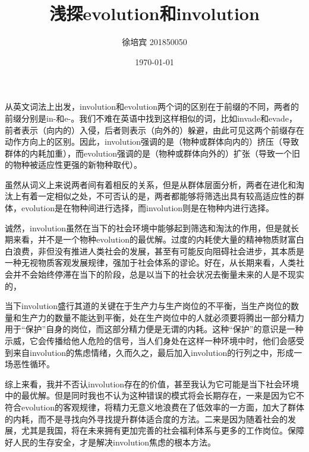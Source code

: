 \documentclass[UTF8]{article}
\title{浅探evolution和involution}
\author{徐培宾 201850050}
\date{\today}
\begin{document}
    \maketitle
    从英文词法上出发，involution和evolution两个词的区别在于前缀的不同，两者的前缀分别是in-和e-。我们不难在英语中找到这样相似的词，比如invade和evade，前者表示（向内的）入侵，后者则表示（向外的）躲避，由此可见这两个前缀存在动作方向上的区别。因此，involution强调的是（物种或群体向内的）挤压（导致群体的内耗加重），而evolution强调的是（物种或群体向外的）扩张（导致一个旧的物种被适应性更强的新物种取代）。

    虽然从词义上来说两者间有着相反的关系，但是从群体层面分析，两者在进化和淘汰上有着一定相似之处，不可否认的是，两者都能够将筛选出具有较高适应性的群体，evolution是在物种间进行选择，而involution则是在物种内进行选择。

    诚然，involution虽然在当下的社会环境中能够起到筛选和淘汰的作用，但是就长期来看，并不是一个物种evolution的最优解。过度的内耗使大量的精神物质财富白白浪费，非但没有推进人类社会的发展，甚至有可能反向阻碍社会进步，其本质是一种无视物质客观发展规律，强加于社会体系的谬论。好在，从长期来看，人类社会并不会始终停滞在当下的阶段，总是以当下的社会状况去衡量未来的人是不现实的，

    当下involution盛行其道的关键在于生产力与生产岗位的不平衡，当生产岗位的数量和生产力的数量不能达到平衡，处在生产岗位中的人就必须要将腾出一部分精力用于“保护”自身的岗位，而这部分精力便是无谓的内耗。这种“保护”的意识是一种示威，它会传播给他人危险的信号，当人们身处在这样一种环境中时，他们会感受到来自involution的焦虑情绪，久而久之，最后加入involution的行列之中，形成一场恶性循环。

    综上来看，我并不否认involution存在的价值，甚至我认为它可能是当下社会环境中的最优解。但是同时我也不认为这种错误的模式将会长期存在，一来是因为它不符合evolution的客观规律，将精力无意义地浪费在了低效率的一方面，加大了群体的内耗，而不是寻找向外寻找提升群体适合度的方法。二来是因为随着社会的发展，尤其是我国，将在未来拥有更加完善的社会福利体系与更多的工作岗位。保障好人民的生存安全，才是解决involution焦虑的根本方法。
\end{document}
